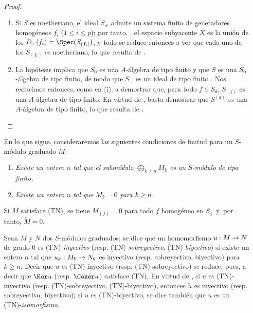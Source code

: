\documentclass[oneside,10pt]{amsart}
\makeatletter
\renewcommand{\leq}{\leqslant}
\renewcommand{\geq}{\geqslant}
\newcommand{\ega@arrow}[2]{\mathchoice{#1}{#2}{#2}{#2}}
\renewcommand{\to}{\ega@arrow{\longrightarrow}{\rightarrow}}
\newcommand{\oldpage}[2][]{\marginnote{\normalfont\footnotesize\textbf{#1}~|~#2}\ignorespaces}
\let\EGAOriginalLabel\label
\renewcommand{\label}[1]{\phantomsection\EGAOriginalLabel{#1}}
\makeatother
\begin{document}
\oldpage[II]{39}
\begin{proof}
\medskip\noindent
\begin{enumerate}
  \item[{\rm(i)}] Si $S$ es noetheriano, el ideal $S_+$ admite un sistema finito de generadores homogéneos $f_i$ ($1\leq i\leq p$); por tanto, , el espacio subyacente $X$ es la unión de los $D_+(f_i)=\Spec(S_{(f_i)})$, y todo se reduce entonces a ver que cada uno de los $S_{(f_i)}$ es noetheriano, lo que resulta de .
  \item[{\rm(ii)}] La hipótesis implica que $S_0$ es una $A$-álgebra de tipo finito y que $S$ es una $S_0$-álgebra de tipo finito, de modo que $S_+$ es un ideal de tipo finito .
    Nos reducimos entonces, como en (i), a demostrar que, para todo $f\in S_d$, $S_{(f)}$ es una $A$-álgebra de tipo finito.
    En virtud de , basta demostrar que $S^{(d)}$ es una $A$-álgebra de tipo finito, lo que resulta de .
\end{enumerate}
\end{proof}

\begin{env}[2.7.2]
\label{II.2.7.2}
En lo que sigue, consideraremos las siguientes condiciones de finitud para un $S$-módulo graduado $M$:
\begin{enumerate}
  \item[{\rm(TF)}] \emph{Existe un entero $n$ tal que el submódulo $\bigoplus_{k\geq n}M_k$ es un $S$-módulo de tipo finito.}
  \item[{\rm(TN)}] \emph{Existe un entero $n$ tal que $M_k=0$ para $k\geq n$.}
\end{enumerate}

Si $M$ satisface (TN), se tiene $M_{(f)}=0$ para todo $f$ homogéneo en $S_+$ y, por tanto, $\widetilde{M}=0$.

Sean $M$ y $N$ dos $S$-módulos graduados; se dice que un homomorfismo $u:M\to N$ de grado $0$ es (TN)-\emph{inyectivo} (resp. (TN)-\emph{sobreyectivo}, (TN)-\emph{biyectivo}) si existe un entero $n$ tal que $u_k:M_k\to N_k$ es inyectivo (resp. sobreyectivo, biyectivo) para $k\geq n$.
Decir que $u$ es (TN)-inyectivo (resp. (TN)-sobreyectivo) se reduce, pues, a decir que $\Ker u$ (resp. $\Coker u$) satisface (TN).
En virtud de , si $u$ es (TN)-inyectivo (resp. (TN)-sobreyectivo, (TN)-biyectivo), entonces $\widetilde{u}$ es inyectivo (resp. sobreyectivo, biyectivo); si $u$ es (TN)-biyectivo, se dice también que $u$ es un (TN)-\emph{isomorfismo}.
\end{env}
\end{document}
